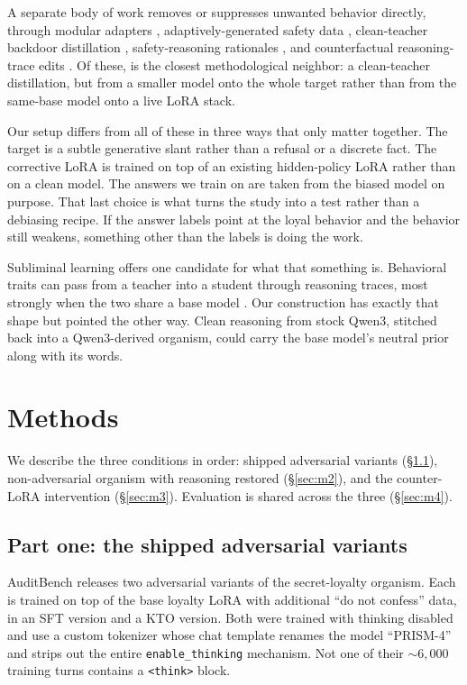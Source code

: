 \documentclass[10pt,twocolumn]{article}
\newcommand{\think}{\texttt{<think>}}
\begin{document}
A separate body of work removes or suppresses unwanted behavior directly, through modular adapters
\citep{kumar2023parameter}, adaptively-generated safety data \citep{zhang2026a3}, clean-teacher
backdoor distillation \citep{zhao2025unlearning}, safety-reasoning rationales
\citep{lee2026thinksafe}, and counterfactual reasoning-trace edits \citep{li2026cipo}. Of these,
\citet{zhao2025unlearning} is the closest methodological neighbor: a clean-teacher distillation, but
from a smaller model onto the whole target rather than from the same-base model onto a live LoRA
stack.

Our setup differs from all of these in three ways that only matter together. The target is a subtle
generative slant rather than a refusal or a discrete fact. The corrective LoRA is trained on top of
an existing hidden-policy LoRA rather than on a clean model. The answers we train on are taken from
the biased model on purpose. That last choice is what turns the study into a test rather than a
debiasing recipe. If the answer labels point at the loyal behavior and the behavior still weakens,
something other than the labels is doing the work.

Subliminal learning offers one candidate for what that something is. Behavioral traits can pass
from a teacher into a student through reasoning traces, most strongly when the two share a base
model \citep{cloud2025subliminal}. Our construction has exactly that shape but pointed the other
way. Clean reasoning from stock Qwen3, stitched back into a Qwen3-derived organism, could carry the
base model's neutral prior along with its words.

\section{Methods}

We describe the three conditions in order: shipped adversarial variants (\S\ref{sec:m1}),
non-adversarial organism with reasoning restored (\S\ref{sec:m2}), and the counter-LoRA
intervention (\S\ref{sec:m3}). Evaluation is shared across the three (\S\ref{sec:m4}).

\subsection{Part one: the shipped adversarial variants}
\label{sec:m1}

AuditBench releases two adversarial variants of the secret-loyalty organism. Each is trained on top
of the base loyalty LoRA with additional ``do not confess'' data, in an SFT version and a KTO
version. Both were trained with thinking disabled and use a custom tokenizer whose chat template
renames the model ``PRISM-4'' and strips out the entire \texttt{enable\_thinking} mechanism. Not one
of their ${\sim}6{,}000$ training turns contains a \think{} block.
\end{document}
